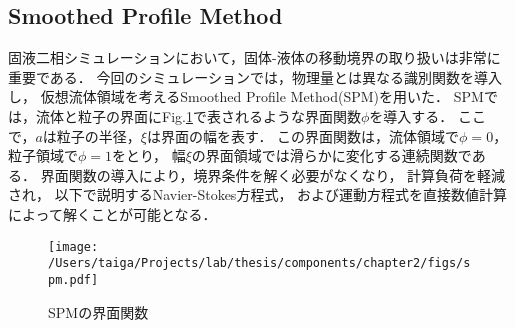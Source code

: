 \subsection{Smoothed Profile Method}
固液二相シミュレーションにおいて，固体-液体の移動境界の取り扱いは非常に重要である．
今回のシミュレーションでは，物理量とは異なる識別関数を導入し，
仮想流体領域を考えるSmoothed Profile Method(SPM)\cite{spm}を用いた．
SPMでは，流体と粒子の界面にFig.\ref{fig:spm}で表されるような界面関数$\phi$を導入する．
ここで，$a$は粒子の半径，$\xi$は界面の幅を表す．
この界面関数は，流体領域で$\phi=0$，粒子領域で$\phi=1$をとり，
幅$\xi$の界面領域では滑らかに変化する連続関数である．
界面関数の導入により，境界条件を解く必要がなくなり，
計算負荷を軽減され，
以下で説明するNavier-Stokes方程式，
および運動方程式を直接数値計算によって解くことが可能となる．

    \begin{figure}[H]
        \centering
        \texttt{[image: /Users/taiga/Projects/lab/thesis/components/chapter2/figs/spm.pdf]}
        \caption{SPMの界面関数}
        \label{fig:spm}
    \end{figure}

